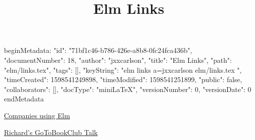 beginMetadata:
{
    "id": "71bf1c46-b786-426e-a8b8-0fc24fca436b",
    "documentNumber": 18,
    "author": "jxxcarlson",
    "title": "Elm Links",
    "path": "elm/links.tex",
    "tags": [],
    "keyString": "elm links a=jxxcarlson elm/links.tex ",
    "timeCreated": 1598541249898,
    "timeModified": 1598541251899,
    "public": false,
    "collaborators": [],
    "docType": "miniLaTeX",
    "versionNumber": 0,
    "versionDate": 0
}
endMetadata
\title{Elm Links}

\maketitle 

\href{https://github.com/jah2488/elm-companies}{Companies using Elm}

\href{https://www.youtube.com/watch?v=X2e_zZa5OnE&list=PLEx5khR4g7PJbSLmADahf0LOpTLifiCra&index=5}{Richard's GoToBookClub Talk}